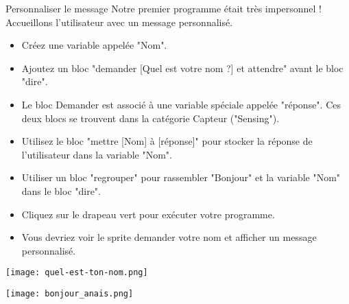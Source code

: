 \begin{UPSTIManipulation}{Personnaliser le message}
    Notre premier programme était très impersonnel ! Accueillons l'utilisateur avec un message personnalisé. 
    \begin{itemize}[label=$\square$]
        \item Créez une variable appelée "Nom".
        \item Ajoutez un bloc "demander [Quel est votre nom ?] et attendre" avant le bloc "dire".
        \item Le bloc Demander est associé à une variable spéciale appelée "réponse". Ces deux blocs se trouvent dans la catégorie Capteur ("Sensing").
        \item Utilisez le bloc "mettre [Nom] à [réponse]" pour stocker la réponse de l'utilisateur dans la variable "Nom".
        \item Utiliser un bloc "regrouper" pour rassembler "Bonjour" et la variable "Nom" dans le bloc "dire".
        \item Cliquez sur le drapeau vert pour exécuter votre programme. 
        \item Vous devriez voir le sprite demander votre nom et afficher un message personnalisé.
    \end{itemize}
    \begin{minipage}{.5\textwidth}
        \begin{center}
            \texttt{[image: quel-est-ton-nom.png]}
        \end{center}
    \end{minipage}\hfill
    \begin{minipage}{.5\textwidth}
        \begin{center}
            \texttt{[image: bonjour\_anais.png]}
        \end{center}
    \end{minipage}
\end{UPSTIManipulation}

